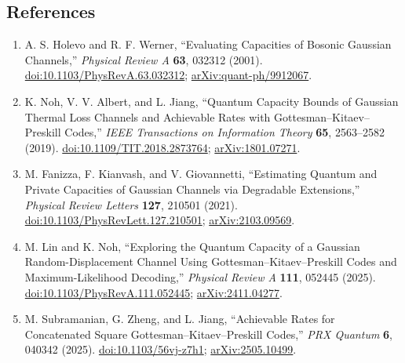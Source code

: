 \subsection*{References}

\begin{enumerate}[label={},leftmargin=4.8em,labelsep=0.5em]
  \footnotesize
  \item[\textup{[HW01]}]\label{ref:p64-holevo-werner}
  A. S. Holevo and R. F. Werner,
  ``Evaluating Capacities of Bosonic Gaussian Channels,''
  \emph{Physical Review A} \textbf{63}, 032312 (2001).
  \href{https://doi.org/10.1103/PhysRevA.63.032312}{doi:10.1103/PhysRevA.63.032312};
  \href{https://arxiv.org/abs/quant-ph/9912067}{arXiv:quant-ph/9912067}.

  \item[\textup{[NAJ19]}]\label{ref:p64-noh-albert-jiang}
  {\sloppy
  K. Noh, V. V. Albert, and L. Jiang,
  ``Quantum Capacity Bounds of Gaussian Thermal Loss Channels and Achievable
  Rates with Gottesman--Kitaev--Preskill Codes,''
  \emph{IEEE Transactions on Information Theory} \textbf{65}, 2563--2582
  (2019).
  \href{https://doi.org/10.1109/TIT.2018.2873764}{doi:10.1109/TIT.2018.2873764};
  \href{https://arxiv.org/abs/1801.07271}{arXiv:1801.07271}.
  \par}

  \item[\textup{[FKG21]}]\label{ref:p64-fanizza-kianvash-giovannetti}
  M. Fanizza, F. Kianvash, and V. Giovannetti,
  ``Estimating Quantum and Private Capacities of Gaussian Channels via
  Degradable Extensions,'' \emph{Physical Review Letters} \textbf{127},
  210501 (2021).
  \href{https://doi.org/10.1103/PhysRevLett.127.210501}{doi:10.1103/PhysRevLett.127.210501};
  \href{https://arxiv.org/abs/2103.09569}{arXiv:2103.09569}.

  \item[\textup{[LN25]}]\label{ref:p64-lin-noh}
  M. Lin and K. Noh,
  ``Exploring the Quantum Capacity of a Gaussian Random-Displacement Channel
  Using Gottesman--Kitaev--Preskill Codes and Maximum-Likelihood Decoding,''
  \emph{Physical Review A} \textbf{111}, 052445 (2025).
  \href{https://doi.org/10.1103/PhysRevA.111.052445}{doi:10.1103/PhysRevA.111.052445};
  \href{https://arxiv.org/abs/2411.04277}{arXiv:2411.04277}.

  \item[\textup{[SZJ25]}]\label{ref:p64-subramanian-zheng-jiang}
  M. Subramanian, G. Zheng, and L. Jiang,
  ``Achievable Rates for Concatenated Square Gottesman--Kitaev--Preskill
  Codes,'' \emph{PRX Quantum} \textbf{6}, 040342 (2025).
  \href{https://doi.org/10.1103/56vj-z7h1}{doi:10.1103/56vj-z7h1};
  \href{https://arxiv.org/abs/2505.10499}{arXiv:2505.10499}.
\end{enumerate}

